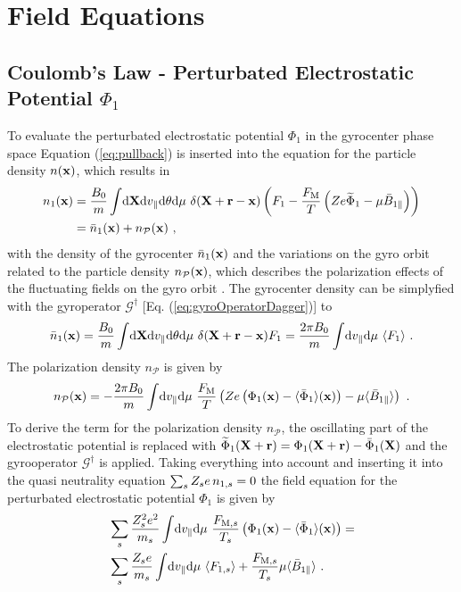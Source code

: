 \section{Field Equations}
\label{sec:fieldEquations}

\subsection{Coulomb's Law - Perturbated Electrostatic Potential $\Phi_1$}
\label{sub:fieldPotential}

To evaluate the perturbated electrostatic potential $\Phi_1$ in the gyrocenter phase space Equation (\ref{eq:pullback}) is inserted into the equation for the particle density $n(\boldsymbol{\mathbf{x}})$, which results in
\begin{gather}
	\begin{aligned}
		n_1(\boldsymbol{\mathbf{x}}) &= \frac{B_0}{m} \int \! \mathrm{d}\boldsymbol{\mathbf{X}}\mathrm{d}v_\parallel\mathrm{d}\theta\mathrm{d}\mu ~ \delta(\boldsymbol{\mathbf{X}} + \boldsymbol{\mathbf{r}} - \boldsymbol{\mathbf{x}}) \left(F_1 - \frac{F_\mathrm{M}}{T}\left(Ze \widetilde{\Phi}_1 - \mu \bar{B}_{1\parallel}\right) \right)\\
		     &= \bar{n}_1(\boldsymbol{\mathbf{x}}) + n_\mathcal{P}(\boldsymbol{\mathbf{x}})~,
	\end{aligned}
	\label{densityPullback}
\end{gather}
with the density of the gyrocenter $\bar{n}_1(\boldsymbol{\mathbf{x}})$ and the variations on the gyro orbit related to the particle density $n_\mathcal{P}(\boldsymbol{\mathbf{x}})$, which describes the polarization effects of the fluctuating fields on the gyro orbit \cite{Brizard2007}. The gyrocenter density can be simplyfied with the gyroperator $\mathcal{G}^\dagger$ [Eq. (\ref{eq:gyroOperatorDagger})] to
\begin{gather}
		\bar{n}_1(\boldsymbol{\mathbf{x}}) = \frac{B_0}{m} \int \! \mathrm{d}\boldsymbol{\mathbf{X}}\mathrm{d}v_\parallel\mathrm{d}\theta\mathrm{d}\mu ~ \delta(\boldsymbol{\mathbf{X}} + \boldsymbol{\mathbf{r}} - \boldsymbol{\mathbf{x}}) F_1 = \frac{2\pi B_0}{m} \int \! \mathrm{d}v_\parallel\mathrm{d}\mu ~ \langle F_1\rangle~.
	\label{eq:gyrocenterDensity}
\end{gather}
The polarization density $n_\mathcal{P}$ is given by
\begin{gather}
	n_\mathcal{P}(\boldsymbol{\mathbf{x}}) =  - \frac{2\pi B_0}{m} \int \! \mathrm{d}v_\parallel\mathrm{d}\mu ~ \frac{F_\mathrm{M}}{T} \left( Ze \left(\Phi_1(\boldsymbol{\mathbf{x}}) - \langle\bar{\Phi}_1\rangle(\boldsymbol{\mathbf{x}}) \right) -  \mu \langle\bar{B}_{1\parallel}\rangle \right) ~.
	\label{eq:polarizationDensity}
\end{gather}
To derive the term for the polarization density $n_\mathcal{P}$, the oscillating part of the electrostatic potential is replaced with $\widetilde{\Phi}_1(\boldsymbol{\mathbf{X}}+ \boldsymbol{\mathbf{r}}) = \Phi_1(\boldsymbol{\mathbf{X}} + \boldsymbol{\mathbf{r}}) - \bar{\Phi}_1 (\boldsymbol{\mathbf{X}})$ and the gyrooperator $\mathcal{G}^\dagger$ is applied. Taking everything into account and inserting it into the quasi neutrality equation $\sum_s Z_s e \, n_{1,s} = 0$ the field equation for the perturbated electrostatic potential $\Phi_1$ is given by
\begin{gather}
	\begin{aligned}
		&\sum_s \frac{Z^2_s e^2}{m_s} \int \! \mathrm{d}v_\parallel\mathrm{d}\mu ~ \frac{F_{\mathrm{M},s}}{T_s} \left(\Phi_1(\boldsymbol{\mathbf{x}}) - \langle\bar{\Phi}_1\rangle(\boldsymbol{\mathbf{x}}) \right) =  \\
		&\sum_s \frac{Z_s e}{m_s} \int \! \mathrm{d}v_\parallel\mathrm{d}\mu ~ \langle F_{1,s}\rangle + \frac{F_{\mathrm{M},s}}{T_s} \mu \langle\bar{B}_{1\parallel}\rangle ~.
	\end{aligned}
	\label{eq:fieldPotential}
\end{gather}


